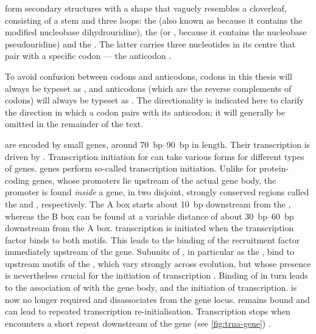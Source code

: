 \trna[s]
form secondary structures with a shape that vaguely resembles a
cloverleaf, consisting of a stem and three loops: the  (also
known as  because it contains the modified nucleobase
dihydrouridine), the  (or , because it contains
the nucleobase pseudouridine) and the . The latter
carries three nucleotides in its centre that pair with a specific codon --- the
anticodon \citep{Kim:1973,Suddath:1974,Robertus:1974,Rich:1978,Schimmel:1979}.

To avoid confusion between codons and anticodons, codons in this thesis will
always be typeset as , and anticodons (which are the
reverse complements of codons) will always be typeset as
. The directionality is indicated here to clarify the
direction in which a codon pairs with its anticodon; it will generally be
omitted in the remainder of the text.


\trna[s] are encoded by small genes, around \SIrange{70}{90}{bp} in length.
Their transcription is driven by . Transcription initiation for  can
take various forms for different types of genes. \trna genes perform so-called
  transcription initiation. Unlike for
protein-coding genes, whose promoters lie upstream of the actual gene body, the
promoter is found \emph{inside} a \trna gene, in two disjoint, strongly
conserved regions called the  and , respectively.
The A box starts about \SI{10}{bp} downstream from the \tss, whereas the B box
can be found at a variable distance of about \SIrange{30}{60}{bp} downstream
from the A box. \trna transcription is initiated when the transcription factor
\tfiiic binds to both motifs. This leads to the binding of the  recruitment
factor \tfiiib immediately upstream of the \trna gene. Subunits of \tfiiib, in
particular as the \tbp, bind to upstream motifs of the \trna, which vary
strongly across evolution, but whose presence is nevertheless crucial for the
initiation of transcription \citep{Palida:1993,White:1992}. Binding of \tfiiib
in turn leads to the association of  with the gene body, and the initiation
of transcription. \tfiiic is now no longer required and disassociates from the
gene locus. \tfiiib remains bound and can lead to repeated transcription
re-initialisation. Transcription stops when  encounters a short \nT repeat
downstream of the \trna gene (see \cref{fig:trna-gene})
\citep{White:1998,Dieci:2007}.


